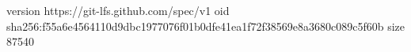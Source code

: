 version https://git-lfs.github.com/spec/v1
oid sha256:f55a6e4564110d9dbc1977076f01b0dfe41ea1f72f38569e8a3680c089c5f60b
size 87540
